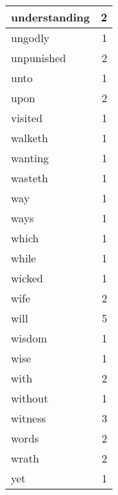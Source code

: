 \begin{center}
\begin{longtable}{l|r}
understanding & 2\\ \hline 
ungodly & 1\\ \hline 
unpunished & 2\\ \hline 
unto & 1\\ \hline 
upon & 2\\ \hline 
visited & 1\\ \hline 
walketh & 1\\ \hline 
wanting & 1\\ \hline 
wasteth & 1\\ \hline 
way & 1\\ \hline 
ways & 1\\ \hline 
which & 1\\ \hline 
while & 1\\ \hline 
wicked & 1\\ \hline 
wife & 2\\ \hline 
will & 5\\ \hline 
wisdom & 1\\ \hline 
wise & 1\\ \hline 
with & 2\\ \hline 
without & 1\\ \hline 
witness & 3\\ \hline 
words & 2\\ \hline 
wrath & 2\\ \hline 
yet & 1\\ \hline 
\end{longtable}  
\end{center}  


  
\normalsize  

  
  
